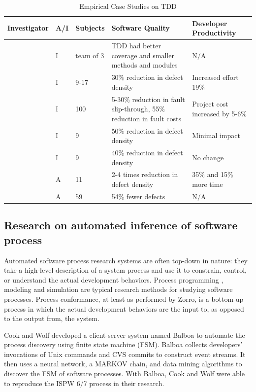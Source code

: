 \documentclass[smallextended]{svjour3}     %
\begin{document}
\begin{table}[ht]
\caption{Empirical Case Studies on TDD}
\begin{tabular}{|p{1.0in}|l|l|p{1.0in}|p{1.0in}|} \hline 
Investigator        & A/I      & Subjects	& Software Quality	& Developer Productivity \\ \hline
\cite{Janzen:08}  & I & team of 3 &  TDD had better  coverage and smaller methods and modules & N/A \\ \hline
\cite{Sanchez:07}& I &  9-17	& 30\% reduction in defect density & Increased effort 19\% \\ \hline
\cite{Damm:06}& I &  100	& 5-30\% reduction in fault slip-through, 55\% reduction in fault costs & Project cost increased by 5-6\% \\ \hline
\cite{Maximilien:03}& I &  9	& 50\% reduction in defect density	& Minimal impact \\ \hline
\cite{Williams:03}  & I & 9	& 40\% reduction in defect density	& No change \\ \hline
\cite{Bhat:06}      & A & 11	& 2-4 times reduction in defect density	& 35\% and 15\% more time \\  \hline
\cite{Edwards:04}   & A & 59	& 54\% fewer defects	& N/A \\ \hline
\end{tabular}
\label{tab:CaseStudyTDDResearch}
\end{table}


\subsection{Research on automated inference of software process}
\label{sec:related-automation}

Automated software process research systems are often top-down in nature:
they take a high-level description of a system process and use it to
constrain, control, or understand the actual development behaviors.
Process programming \citep{Sutton:95}, modeling \citep{Curtis:92} and
simulation \citep{Turnu:04,Jensen:05} are typical research methods for
studying software processes.  Process conformance, at least as performed by Zorro,
is a bottom-up process in which the actual development behaviors are
the input to, as opposed to the output from, the system.

Cook and Wolf \citep{Cook:95,Cook:96} developed a client-server system
named Balboa to automate the process discovery using finite state machine
(FSM). Balboa collects developers' invocations of Unix commands and CVS
commits to construct event streams. It then uses a neural network, a MARKOV
chain, and data mining algorithms to discover the FSM of software
processes. With Balboa, Cook and Wolf were able to reproduce the ISPW 6/7
process  \citep{ispw6} in their research.
\end{document}

